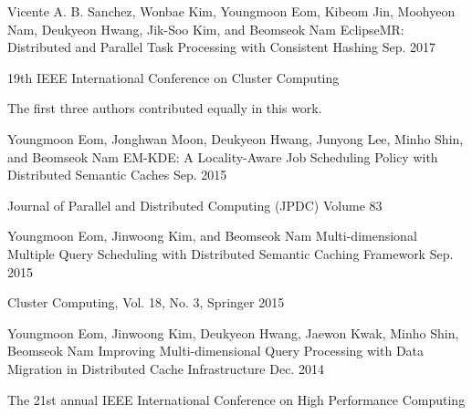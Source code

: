 


\begin{cventries}


\cventry
{Vicente A. B. Sanchez, Wonbae Kim, Youngmoon Eom, Kibeom Jin, Moohyeon Nam, Deukyeon Hwang, Jik-Soo Kim, and Beomseok Nam} %
{EclipseMR: Distributed and Parallel Task Processing with Consistent Hashing} %
{} %
{Sep. 2017} %
{ %
\begin{cvitems}
\item {19th IEEE International Conference on Cluster Computing}
\item {The first three authors contributed equally in this work.}
\end{cvitems}
}


\cventry
{Youngmoon Eom, Jonghwan Moon, Deukyeon Hwang, Junyong Lee, Minho Shin, and Beomseok Nam} %
{EM-KDE: A Locality-Aware Job Scheduling Policy with Distributed Semantic Caches} %
{} %
{Sep. 2015} %
{ %
\begin{cvitems}
\item {Journal of Parallel and Distributed Computing (JPDC) Volume 83}
\end{cvitems}
}


\cventry
{Youngmoon Eom, Jinwoong Kim, and Beomseok Nam} %
{Multi-dimensional Multiple Query Scheduling with Distributed Semantic Caching Framework} %
{} %
{Sep. 2015} %
{ %
\begin{cvitems}
\item {Cluster Computing, Vol. 18, No. 3, Springer 2015}
\end{cvitems}
}

\cventry
{Youngmoon Eom, Jinwoong Kim, Deukyeon Hwang, Jaewon Kwak, Minho Shin, Beomseok Nam} %
{Improving Multi-dimensional Query Processing with Data Migration in Distributed Cache Infrastructure} %
{} %
{Dec. 2014} %
{ %
\begin{cvitems}
\item {The 21st annual IEEE International Conference on High Performance Computing}
\end{cvitems}
}


\end{cventries}
